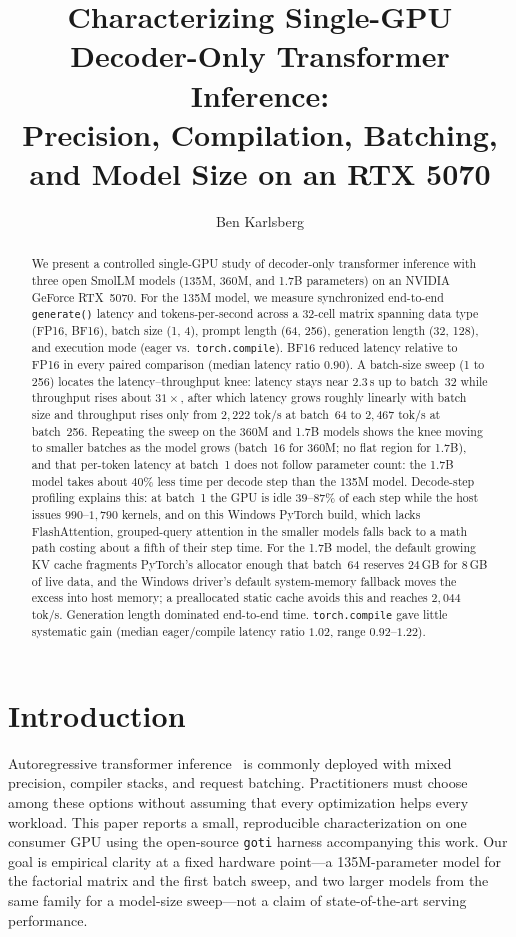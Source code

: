 \documentclass[11pt]{article}
\title{Characterizing Single-GPU Decoder-Only Transformer Inference:\\
Precision, Compilation, Batching, and Model Size on an RTX 5070}
\author{Ben Karlsberg}
\date{}
\begin{document}
\maketitle

\begin{abstract}
We present a controlled single-GPU study of decoder-only transformer inference with three open SmolLM models (135M, 360M, and 1.7B parameters) on an NVIDIA GeForce RTX~5070.
For the 135M model, we measure synchronized end-to-end \texttt{generate()} latency and tokens-per-second across a 32-cell matrix spanning data type (FP16, BF16), batch size (1, 4), prompt length (64, 256), generation length (32, 128), and execution mode (eager vs.\ \texttt{torch.compile}).
BF16 reduced latency relative to FP16 in every paired comparison (median latency ratio $0.90$).
A batch-size sweep (1 to 256) locates the latency--throughput knee: latency stays near $2.3$\,s up to batch~32 while throughput rises about $31\times$, after which latency grows roughly linearly with batch size and throughput rises only from $2{,}222$ tok/s at batch~64 to $2{,}467$ tok/s at batch~256.
Repeating the sweep on the 360M and 1.7B models shows the knee moving to smaller batches as the model grows (batch~16 for 360M; no flat region for 1.7B), and that per-token latency at batch~1 does not follow parameter count: the 1.7B model takes about $40\%$ less time per decode step than the 135M model.
Decode-step profiling explains this: at batch~1 the GPU is idle $39$--$87\%$ of each step while the host issues $990$--$1{,}790$ kernels, and on this Windows PyTorch build, which lacks FlashAttention, grouped-query attention in the smaller models falls back to a math path costing about a fifth of their step time.
For the 1.7B model, the default growing KV cache fragments PyTorch's allocator enough that batch~64 reserves $24$\,GB for $8$\,GB of live data, and the Windows driver's default system-memory fallback moves the excess into host memory; a preallocated static cache avoids this and reaches $2{,}044$ tok/s.
Generation length dominated end-to-end time.
\texttt{torch.compile} gave little systematic gain (median eager/compile latency ratio $1.02$, range $0.92$--$1.22$).
\end{abstract}

\section{Introduction}
Autoregressive transformer inference~\cite{vaswani2017attention} is commonly deployed with mixed precision, compiler stacks, and request batching.
Practitioners must choose among these options without assuming that every optimization helps every workload.
This paper reports a small, reproducible characterization on one consumer GPU using the open-source \texttt{goti} harness accompanying this work.
Our goal is empirical clarity at a fixed hardware point---a 135M-parameter model for the factorial matrix and the first batch sweep, and two larger models from the same family for a model-size sweep---not a claim of state-of-the-art serving performance.
\end{document}
